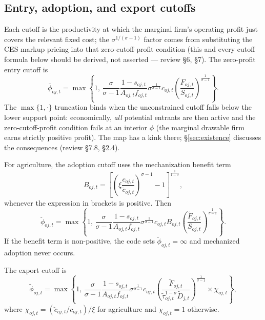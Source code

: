 \documentclass[11pt]{article}
\begin{document}
\subsection{Entry, adoption, and export cutoffs}\label{sec:cutoffs}
Each cutoff is the productivity at which the marginal firm's operating profit just covers
the relevant fixed cost; the $\sigma^{1/(\sigma-1)}$ factor comes from substituting the
CES markup pricing into that zero-cutoff-profit condition (this and every cutoff formula
below should be derived, not asserted --- review \S6, \S7). The zero-profit entry cutoff is
\begin{equation}
  \bar\phi_{oj,t}
  =
  \max\left\{
    1,\,
    \frac{\sigma}{\sigma-1}
    \frac{1-s_{oj,t}}{A_{oj,t} f_{oj,t}}
    \sigma^{\frac{1}{\sigma-1}}
    c_{oj,t}
    \left( \frac{F_{oj,t}}{S_{oj,t}} \right)^{\frac{1}{\sigma-1}}
  \right\}.
\end{equation}
The $\max\{1,\cdot\}$ truncation binds when the unconstrained cutoff falls below the lower
support point: economically, \emph{all} potential entrants are then active and the
zero-cutoff-profit condition fails at an interior $\phi$ (the marginal drawable firm earns
strictly positive profit). The map has a kink there; \S\ref{sec:existence} discusses the
consequences (review \S7.8, \S2.4).

For agriculture, the adoption cutoff uses the mechanization benefit term
\begin{equation}
  B_{oj,t}
  =
  \left[
    \left( \xi \frac{c_{oj,t}}{\breve c_{oj,t}} \right)^{\sigma-1} - 1
  \right]^{\frac{1}{1-\sigma}},
\end{equation}
whenever the expression in brackets is positive. Then
\begin{equation}
  \breve\phi_{oj,t}
  =
  \max\left\{
    1,\,
    \frac{\sigma}{\sigma-1}
    \frac{1-s_{oj,t}}{A_{oj,t} f_{oj,t}}
    \sigma^{\frac{1}{\sigma-1}}
    c_{oj,t} B_{oj,t}
    \left( \frac{\breve F_{oj,t}}{S_{oj,t}} \right)^{\frac{1}{\sigma-1}}
  \right\}.
\end{equation}
If the benefit term is non-positive, the code sets $\breve\phi_{oj,t} = \infty$ and
mechanized adoption never occurs.

The export cutoff is
\begin{equation}
  \tilde\phi_{oj,t}
  =
  \max\left\{
    1,\,
    \frac{\sigma}{\sigma-1}
    \frac{1-s_{oj,t}}{A_{oj,t} f_{oj,t}}
    \sigma^{\frac{1}{\sigma-1}}
    c_{oj,t}
    \left(
      \frac{\tilde F_{oj,t}}
      {\tilde\tau_{oj,t}^{1-\sigma} \tilde D_{j,t}}
    \right)^{\frac{1}{\sigma-1}}
    \times \chi_{oj,t}
  \right\},
\end{equation}
where $\chi_{oj,t} = (\breve c_{oj,t}/c_{oj,t}) / \xi$ for agriculture and
$\chi_{oj,t} = 1$ otherwise.
\end{document}
